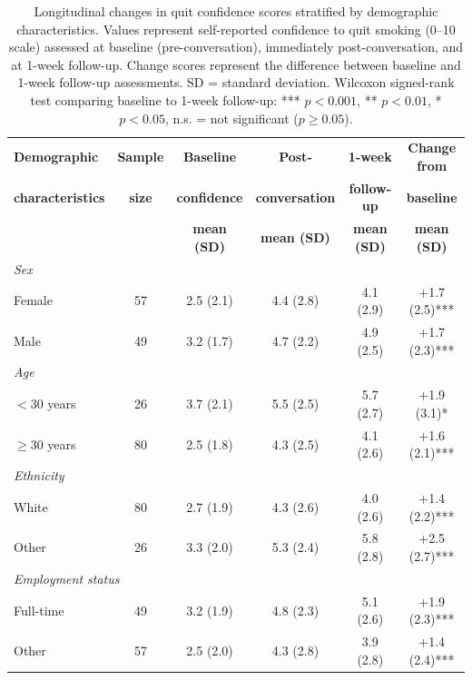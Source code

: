 \begin{table}[ht!]
  \centering
  \small
  \renewcommand{\arraystretch}{1.1}
  \begin{tabular*}{\linewidth}{@{\extracolsep{\fill}}lccccc@{}}
    \toprule
    \textbf{Demographic} & \textbf{Sample} & \textbf{Baseline} & \textbf{Post-} & \textbf{1-week} & \textbf{Change from} \\
    \textbf{characteristics} & \textbf{size} & \textbf{confidence} & \textbf{conversation} & \textbf{follow-up} & \textbf{baseline} \\
    & & \textbf{mean (SD)} & \textbf{mean (SD)} & \textbf{mean (SD)} & \textbf{mean (SD)} \\
    \midrule
    \multicolumn{6}{l}{\textit{Sex}} \\
    \quad Female & 57 & 2.5 (2.1) & 4.4 (2.8) & 4.1 (2.9) & +1.7 (2.5)*** \\
    \quad Male & 49 & 3.2 (1.7) & 4.7 (2.2) & 4.9 (2.5) & +1.7 (2.3)*** \\
    \midrule
    \multicolumn{6}{l}{\textit{Age}} \\
    \quad $<30$ years & 26 & 3.7 (2.1) & 5.5 (2.5) & 5.7 (2.7) & +1.9 (3.1)* \\
    \quad $\geq30$ years & 80 & 2.5 (1.8) & 4.3 (2.5) & 4.1 (2.6) & +1.6 (2.1)*** \\
    \midrule
    \multicolumn{6}{l}{\textit{Ethnicity}} \\
    \quad White & 80 & 2.7 (1.9) & 4.3 (2.6) & 4.0 (2.6) & +1.4 (2.2)*** \\
    \quad Other & 26 & 3.3 (2.0) & 5.3 (2.4) & 5.8 (2.8) & +2.5 (2.7)*** \\
    \midrule
    \multicolumn{6}{l}{\textit{Employment status}} \\
    \quad Full-time & 49 & 3.2 (1.9) & 4.8 (2.3) & 5.1 (2.6) & +1.9 (2.3)*** \\
    \quad Other & 57 & 2.5 (2.0) & 4.3 (2.8) & 3.9 (2.8) & +1.4 (2.4)*** \\
    \bottomrule
  \end{tabular*}
  \caption{Longitudinal changes in quit confidence scores stratified by demographic characteristics. Values represent self-reported confidence to quit smoking (0--10 scale) assessed at baseline (pre-conversation), immediately post-conversation, and at 1-week follow-up. Change scores represent the difference between baseline and 1-week follow-up assessments. SD = standard deviation. Wilcoxon signed-rank test comparing baseline to 1-week follow-up: *** $p < 0.001$, ** $p < 0.01$, * $p < 0.05$, n.s. = not significant ($p \geq 0.05$).}
  \label{table:demographics_wise_conf}
\end{table}

